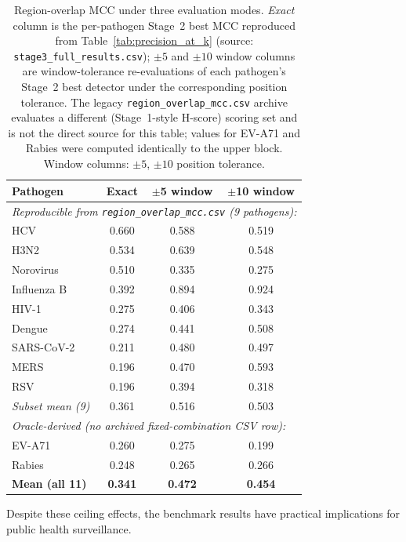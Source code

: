 \begin{table}[htbp]
\centering
\caption{Region-overlap MCC under three evaluation modes. \emph{Exact} column is the per-pathogen Stage~2 best MCC reproduced from Table~\ref{tab:precision_at_k} (source: \texttt{stage3\_full\_results.csv}); $\pm 5$ and $\pm 10$ window columns are window-tolerance re-evaluations of each pathogen's Stage~2 best detector under the corresponding position tolerance. The legacy \texttt{region\_overlap\_mcc.csv} archive evaluates a different (Stage~1-style H-score) scoring set and is not the direct source for this table; values for EV-A71 and Rabies were computed identically to the upper block. Window columns: $\pm 5$, $\pm 10$ position tolerance.}
\label{tab:region_overlap_mcc}
\small
\begin{tabular}{lccc}
\toprule
\textbf{Pathogen} & \textbf{Exact} & \textbf{$\pm$5 window} & \textbf{$\pm$10 window} \\
\midrule
\multicolumn{4}{l}{\textit{Reproducible from \texttt{region\_overlap\_mcc.csv} (9 pathogens):}} \\
HCV           & 0.660 & 0.588 & 0.519 \\
H3N2          & 0.534 & 0.639 & 0.548 \\
Norovirus     & 0.510 & 0.335 & 0.275 \\
Influenza B   & 0.392 & 0.894 & 0.924 \\
HIV-1         & 0.275 & 0.406 & 0.343 \\
Dengue        & 0.274 & 0.441 & 0.508 \\
SARS-CoV-2    & 0.211 & 0.480 & 0.497 \\
MERS          & 0.196 & 0.470 & 0.593 \\
RSV           & 0.196 & 0.394 & 0.318 \\
\midrule
\textit{Subset mean (9)} & 0.361 & 0.516 & 0.503 \\
\midrule
\multicolumn{4}{l}{\textit{Oracle-derived (no archived fixed-combination CSV row):}} \\
EV-A71        & 0.260 & 0.275 & 0.199 \\
Rabies        & 0.248 & 0.265 & 0.266 \\
\midrule
\textbf{Mean (all 11)} & \textbf{0.341} & \textbf{0.472} & \textbf{0.454} \\
\bottomrule
\end{tabular}
\end{table}

Despite these ceiling effects, the benchmark results have practical implications for public health surveillance.

